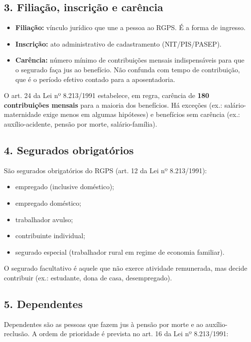 \documentclass[11pt,a4paper]{article}
\begin{document}
\subsection*{3. Filiação, inscrição e carência}

\begin{itemize}
  \item \textbf{Filiação:} vínculo jurídico que une a pessoa ao RGPS. É a forma de ingresso.
  \item \textbf{Inscrição:} ato administrativo de cadastramento (NIT/PIS/PASEP).
  \item \textbf{Carência:} número mínimo de contribuições mensais indispensáveis para que o segurado faça jus ao benefício. Não confunda com tempo de contribuição, que é o período efetivo contado para a aposentadoria.
\end{itemize}

O art. 24 da Lei nº 8.213/1991 estabelece, em regra, carência de \textbf{180 contribuições mensais} para a maioria dos benefícios. Há exceções (ex.: salário-maternidade exige menos em algumas hipóteses) e benefícios sem carência (ex.: auxílio-acidente, pensão por morte, salário-família).

\subsection*{4. Segurados obrigatórios}

São segurados obrigatórios do RGPS (art. 12 da Lei nº 8.213/1991):

\begin{itemize}
  \item empregado (inclusive doméstico);
  \item empregado doméstico;
  \item trabalhador avulso;
  \item contribuinte individual;
  \item segurado especial (trabalhador rural em regime de economia familiar).
\end{itemize}

O segurado facultativo é aquele que não exerce atividade remunerada, mas decide contribuir (ex.: estudante, dona de casa, desempregado).

\subsection*{5. Dependentes}

Dependentes são as pessoas que fazem jus à pensão por morte e ao auxílio- reclusão. A ordem de prioridade é prevista no art. 16 da Lei nº 8.213/1991:
\end{document}
